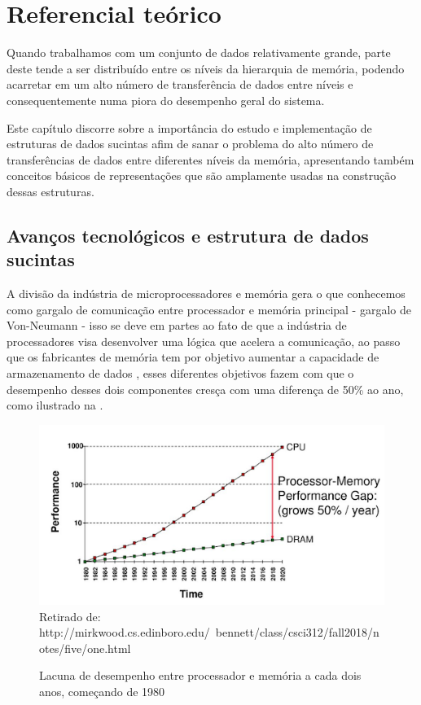 \chapter{Referencial teórico}\label{ch:fundamentacao}

Quando trabalhamos com um conjunto de dados relativamente grande, parte deste tende a ser distribuído entre os níveis da hierarquia de memória, 
podendo acarretar em um alto número de transferência de dados entre níveis e consequentemente numa piora do desempenho geral do sistema. 

Este capítulo discorre sobre a importância do estudo e implementação de estruturas de dados sucintas afim de sanar o problema do alto número de transferências
de dados entre diferentes níveis da memória, apresentando também conceitos básicos de representações que são amplamente usadas na construção dessas estruturas. 

\section{Avanços tecnológicos e estrutura de dados sucintas}
A divisão da indústria de microprocessadores e memória gera o que conhecemos como  gargalo de comunicação entre processador e  memória principal - gargalo de Von-Neumann - isso se deve em partes ao fato de que a indústria de processadores visa desenvolver uma lógica que acelera a comunicação, ao passo que os fabricantes de memória tem por objetivo aumentar a capacidade de armazenamento de dados \citep{paper-processor-memory-bottleneck}, esses diferentes objetivos fazem com que o desempenho desses dois componentes cresça com uma diferença de 50\%  ao ano, como ilustrado na .
\begin{figure}[!ht]
\centering
  \caption[Lacuna de desempenho entre processador e memória a cada dois anos, começando de 1980]{Lacuna de desempenho entre processador e memória a cada dois anos, começando de 1980}
  \includegraphics[scale=0.7]{images/gap-processor-memory.png}
  \footnotesize{Retirado de: http://mirkwood.cs.edinboro.edu/~bennett/class/csci312/fall2018/notes/five/one.html}
  \label{fig:processor-memory-performance-gap}
\end{figure} 

